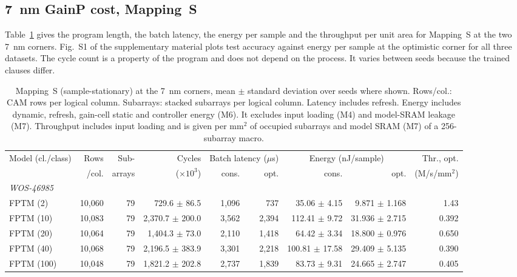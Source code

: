 \documentclass[preprint,review,12pt]{elsarticle}
\newcommand{\gainp}{GainP}
\newcommand{\hyp}[1]{#1}   %
\newcommand{\wosnew}[1]{#1}   %
\begin{document}
\subsection{7~nm \gainp{} cost, Mapping~S}
Table~\ref{tab:mapS} gives the program length, the batch latency, the energy per sample and the throughput per unit area for Mapping~S at the two 7~nm corners.
\wosnew{Fig.~S1 of the supplementary material plots test accuracy against energy per sample at the optimistic corner for all three datasets.}
The cycle count is a property of the program and does not depend on the process. It varies between seeds because the trained clauses differ.

\begin{table}
\footnotesize
\setlength{\tabcolsep}{4pt}
\centering
\caption{Mapping~S (sample-stationary) at the 7~nm corners, mean $\pm$ standard deviation over seeds where shown. Rows/col.: CAM rows per logical column. Subarrays: stacked subarrays per logical column. Latency includes refresh. Energy includes dynamic, refresh, gain-cell static and controller energy (M6). It excludes input loading (M4) and model-SRAM leakage (M7). Throughput includes input loading and is given per mm$^2$ of occupied subarrays and model SRAM (M7) of a 256-subarray macro.}
\label{tab:mapS}
\begin{tabular}{lrrrrrrrr}
\toprule
\multirow{2}{*}{Model (cl./class)} & Rows & Sub- & Cycles & \multicolumn{2}{c}{Batch latency ($\mu$s)} & \multicolumn{2}{c}{Energy (nJ/sample)} & Thr., opt. \\
 & /col. & arrays & ($\times10^3$) & cons. & opt. & cons. & opt. & (M/s/mm$^2$) \\
\midrule
\multicolumn{9}{l}{\textit{WOS-46985}} \\
FPTM (2) & 10,060 & 79 & 729.6 $\pm$ 86.5 & \hyp{1,096} & \hyp{737} & \hyp{35.06 $\pm$ 4.15} & \hyp{9.871 $\pm$ 1.168} & \hyp{1.43} \\
FPTM (10) & 10,083 & 79 & 2,370.7 $\pm$ 200.0 & \hyp{3,562} & \hyp{2,394} & \hyp{112.41 $\pm$ 9.72} & \hyp{31.936 $\pm$ 2.715} & \hyp{0.392} \\
FPTM (20) & 10,064 & 79 & 1,404.3 $\pm$ 73.0 & \hyp{2,110} & \hyp{1,418} & \hyp{64.42 $\pm$ 3.34} & \hyp{18.800 $\pm$ 0.976} & \hyp{0.650} \\
FPTM (40) & 10,068 & 79 & 2,196.5 $\pm$ 383.9 & \hyp{3,301} & \hyp{2,218} & \hyp{100.81 $\pm$ 17.58} & \hyp{29.409 $\pm$ 5.135} & \hyp{0.390} \\
FPTM (100) & 10,048 & 79 & 1,821.2 $\pm$ 202.8 & \hyp{2,737} & \hyp{1,839} & \hyp{83.73 $\pm$ 9.31} & \hyp{24.665 $\pm$ 2.747} & \hyp{0.405} \\

\end{tabular}
\end{table}
\end{document}
